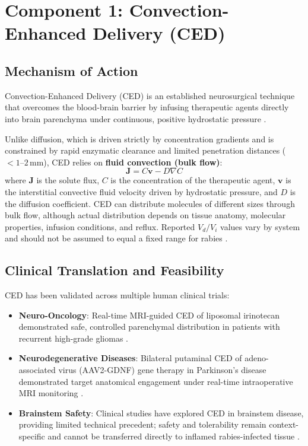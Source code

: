 \documentclass[12pt,a4paper]{article}
\begin{document}
\section{Component 1: Convection-Enhanced Delivery (CED)}

\subsection{Mechanism of Action}

Convection-Enhanced Delivery (CED) is an established neurosurgical technique that overcomes the blood-brain barrier by infusing therapeutic agents directly into brain parenchyma under continuous, positive hydrostatic pressure \citep{parvar2025ced}.

Unlike diffusion, which is driven strictly by concentration gradients and is constrained by rapid enzymatic clearance and limited penetration distances ($<1\text{--}2\,\mathrm{mm}$), CED relies on \textbf{fluid convection (bulk flow)}:
\begin{equation}
\mathbf{J} = C \mathbf{v} - D \nabla C
\end{equation}
where $\mathbf{J}$ is the solute flux, $C$ is the concentration of the therapeutic agent, $\mathbf{v}$ is the interstitial convective fluid velocity driven by hydrostatic pressure, and $D$ is the diffusion coefficient. CED can distribute molecules of different sizes through bulk flow, although actual distribution depends on tissue anatomy, molecular properties, infusion conditions, and reflux. Reported $V_d/V_i$ values vary by system and should not be assumed to equal a fixed range for rabies \citep{parvar2025ced}.

\subsection{Clinical Translation and Feasibility}

CED has been validated across multiple human clinical trials:
\begin{itemize}
    \item \textbf{Neuro-Oncology}: Real-time MRI-guided CED of liposomal irinotecan demonstrated safe, controlled parenchymal distribution in patients with recurrent high-grade gliomas \citep{narsinh2025ced}.
    \item \textbf{Neurodegenerative Diseases}: Bilateral putaminal CED of adeno-associated virus (AAV2-GDNF) gene therapy in Parkinson's disease demonstrated target anatomical engagement under real-time intraoperative MRI monitoring \citep{munjal2026ced}.
    \item \textbf{Brainstem Safety}: Clinical studies have explored CED in brainstem disease, providing limited technical precedent; safety and tolerability remain context-specific and cannot be transferred directly to inflamed rabies-infected tissue \citep{morgenstern2019brainstemced}.
\end{itemize}
\end{document}
